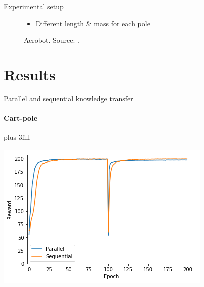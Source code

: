\begin{frame}[fragile]{Experimental setup}
\begin{figure}[htb]
\begin{minipage}{0.45\textwidth}
            \caption{Acrobot. Source: \cite{fremaux2013reinforcement}.}
            \begin{itemize}
                \item Different length \& mass for each pole
            \end{itemize}
    \end{minipage}
\end{figure}
\end{frame}

\section{Results}
\frame{\sectionpage}
\begin{frame}[fragile]{Parallel and sequential knowledge transfer}
\framesubtitle{Cart-pole}
\vskip0pt plus 3fill
\begin{center}
    \includegraphics[width=.8\linewidth]{results/CartPole/kt_akt/reward_source-target_5tasks.png}
\end{center}
\end{frame}

